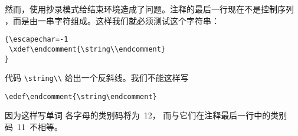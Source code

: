\documentclass{book}
\begin{document}
然而，使用抄录模式给结束环境造成了问题。注释的最后一行现在不是控制序列
，而是由一串字符组成。这样我们就必须测试这个字符串：
\begin{verbatim}
{\escapechar=-1
 \xdef\endcomment{\string\\endcomment}
}
\end{verbatim}
代码 \verb>\string\\> 给出一个反斜线。我们不能这样写
\begin{verbatim}
\edef\endcomment{\string\endcomment}
\end{verbatim}
因为这样写单词  各字母的类别码将为~12，
而与它们在注释最后一行中的类别码~11~不相等。

\endofchapter
\end{document}
